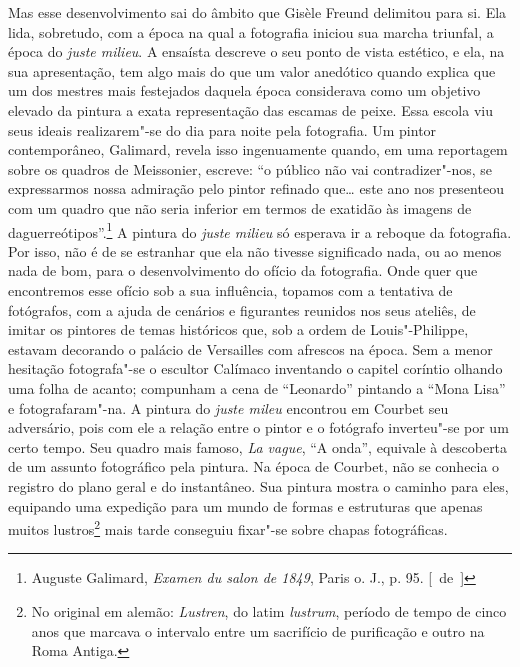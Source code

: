 Mas esse desenvolvimento sai do âmbito que Gisèle Freund delimitou
para si. Ela lida, sobretudo, com a época na qual a fotografia iniciou
sua marcha triunfal, a época do \emph{juste milieu}. A ensaísta
descreve o seu ponto de vista estético, e ela, na sua apresentação, tem algo mais do que um valor anedótico quando explica que
um dos mestres mais festejados daquela época considerava como um objetivo
elevado da pintura a exata representação das escamas de peixe. Essa
escola viu seus ideais realizarem"-se do dia para noite pela fotografia.
Um pintor contemporâneo, Galimard, revela isso ingenuamente quando, em
uma reportagem sobre os quadros de Meissonier, escreve: ``o público não
vai contradizer"-nos, se expressarmos nossa admiração pelo pintor
refinado que\ldots{} este ano nos presenteou com um quadro que não seria
inferior em termos de exatidão às imagens de daguerreótipos''.\footnote{Auguste Galimard,
  \emph{Examen du salon de 1849}, Paris o. J., p. 95. [~de~]} A pintura
do \emph{juste milieu} só esperava ir a reboque da
fotografia. Por isso, não é de se estranhar que ela não tivesse
significado nada, ou ao menos nada de bom, para o desenvolvimento do
ofício da fotografia. Onde quer que encontremos esse ofício sob a sua
influência, topamos com a tentativa de fotógrafos, com a ajuda de
cenários e figurantes reunidos nos seus ateliês, de imitar os
pintores de temas históricos que, sob a ordem de Louis"-Philippe, estavam decorando
o palácio de Versailles com afrescos na época. Sem a menor hesitação fotografa"-se o
escultor Calímaco inventando o capitel coríntio olhando
uma folha de acanto; compunham a cena de ``Leonardo'' pintando a ``Mona
Lisa'' e fotografaram"-na. A pintura do \emph{juste mileu} encontrou em
Courbet seu adversário, pois com ele a relação entre o pintor e o fotógrafo
inverteu"-se por um certo tempo. Seu quadro mais famoso, \emph{La vague},
``A onda'', equivale à descoberta de um assunto fotográfico pela
pintura. Na época de Courbet, não se conhecia o registro do plano geral
e do instantâneo. Sua pintura mostra o caminho para eles, equipando uma
expedição para um mundo de formas e estruturas que apenas muitos
lustros\footnote{No original em alemão: \emph{Lustren}, do latim \emph{lustrum},
  período de tempo de cinco anos que marcava o intervalo entre um
  sacrifício de purificação e outro na Roma Antiga. \versal{[N.~T.]}} mais tarde
conseguiu fixar"-se sobre chapas fotográficas.

